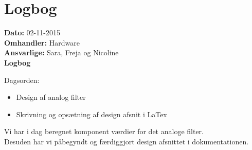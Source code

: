 \section{Logbog}

\textbf{Dato:} 02-11-2015 \\
\textbf{Omhandler:} Hardware \\
\textbf{Ansvarlige:} Sara, Freja og Nicoline \\
\textbf{Logbog}

Dagsorden:
\begin{itemize}
	\item Design af analog filter
	\item Skrivning og opsætning af design afsnit i LaTex
\end{itemize}

Vi har i dag beregnet komponent værdier for det analoge filter.\\
Desuden har vi påbegyndt og færdiggjort design afsnittet i dokumentationen.\\

   
